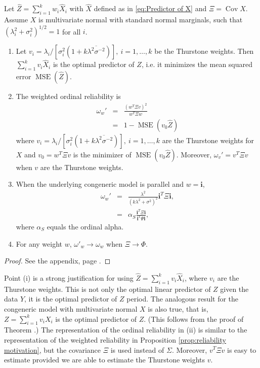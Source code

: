 \documentclass[twoside]{article}
\DeclareMathOperator{\Cov}{Cov}
\DeclareMathOperator{\MSE}{MSE}
\renewcommand{\sqrt}[1]{{(#1)^{1/2}}}
\begin{document}
\begin{thm}
\label{thm:omega-prime}Let $\hat{Z}=\sum_{i=1}^{k}w_{i}\hat{X}_{i}$
with $\hat{X}$ defined as in \eqref{eq:Predictor of X} and $\Xi=\Cov\hat{X}$.
Assume $X$ is multivariate normal with standard normal marginals,
such that $\sqrt{\lambda_{i}^{2}+\sigma_{i}^{2}}=1$ for all $i$.
\begin{enumerate}[label=(\roman*)]
\item Let  $v_{i}=\lambda_{i}/[\sigma_{i}^{2}(1+k\overline{\lambda^{2}\sigma^{-2}})],\:i=1,\ldots,k$ be the Thurstone weights. Then $\sum_{i=1}^{k}v_{i}\hat{X}_{i}$
is the optimal predictor of $Z$, i.e. it minimizes the mean squared
error $\MSE(\hat{Z})$.
\item The weighted ordinal reliability is
\begin{eqnarray}
\omega_{w}' & = & \frac{(w^{T}\Xi v)^{2}}{w^{T}\Xi w}\label{eq:Omega prime}\\
 & = & 1-\MSE(v_{0}\hat{Z})\nonumber 
\end{eqnarray}
where $v_{i}=\lambda_{i}/[\sigma_{i}^{2}(1+k\overline{\lambda^{2}\sigma^{-2}})],\:i=1,\ldots,k$
are the Thurstone weights for $X$ and $v_{0}=w^{T}\Xi v$ is the
minimizer of $\MSE(v_{0}\hat{Z})$. Moreover, $\omega_{v}'=v^{T}\Xi v$ when $v$
are the Thurstone weights.
\item When the underlying congeneric model is parallel and $w=\mathbf{i}$,
\begin{eqnarray}
\omega_{w}' & = & \frac{\lambda^{2}}{(k\lambda^{2}+\sigma^{2})^{2}}\mathbf{i}^{T}\Xi\mathbf{i},\label{eq:Alpha prime}\\
 & = & \alpha_S\frac{\mathbf{i}^{T}\Xi\mathbf{i}}{\mathbf{i}^{T}\Psi\mathbf{i}},\nonumber 
\end{eqnarray}
where $\alpha_S$ equals the ordinal alpha.
\item For any weight $w$, $\omega'_{w}\to\omega_{w}$ when $\Xi\to\Phi$. 
\end{enumerate}
\end{thm}

\begin{proof}
See the appendix, page \pageref{proof:omega-prime}.
\end{proof}
Point (i) is a strong justification for using $\hat{Z}=\sum_{i=1}^{k}v_{i}\hat{X}_{i}$,
where $v_{i}$ are the Thurstone weights. This is not only the optimal
linear predictor of $Z$ given the data $Y$, it is the optimal predictor
of $Z$ period. The analogous result for the congeneric model with
multivariate normal $X$ is also true, that is, $Z=\sum_{i=1}^{k}v_{i}X_{i}$
is the optimal predictor of $Z$. (This follows from the proof of
Theorem \pageref{thm:omega-prime}.) The representation of the ordinal
reliability in (ii) is similar to the representation of the weighted
reliability in Proposition \ref{prop:reliability motivation}, but the covariance $\Xi$ is used
instead of $\Sigma$. Moreover, $v^{T}\Xi v$ is easy to estimate
provided we are able to estimate the Thurstone weights $v$. 
\end{document}
